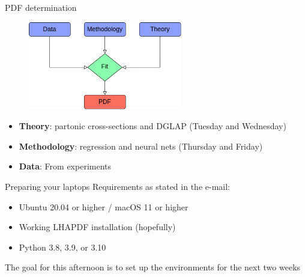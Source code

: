 \documentclass[9pt,t]{beamer}
\begin{document}
\begin{frame}{PDF determination}
  \begin{figure}
    \centering
    \includegraphics[width=0.6\textwidth]{figures/pdffitflowchart.png}
  \end{figure}
  \begin{itemize}
    \item \textbf{Theory}: partonic cross-sections and DGLAP (Tuesday and Wednesday)
    \item \textbf{Methodology}: regression and neural nets (Thursday and Friday)
    \item \textbf{Data}: From experiments
  \end{itemize}
\end{frame}



\begin{frame}{Preparing your laptops}
  Requirements as stated in the e-mail:
  \begin{itemize}
    \item Ubuntu 20.04 or higher / macOS 11 or higher
    \item Working LHAPDF installation (hopefully)
    \item Python 3.8, 3.9, or 3.10 
  \end{itemize}
  \vspace*{0.5cm}
  The goal for this afternoon is to set up the environments for the next two weeks
\end{frame}
\end{document}
